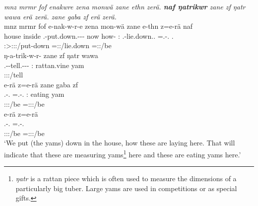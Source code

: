 \begin{exe}
	\ex \emph{mnz mrmr fof enakwre zena monwä zane ethn zerä. \textbf{naf ŋatrikwr} zane zf ŋatr wawa erä zerä. zane gaba zf erä zerä.}\\
	\glll mnz mrmr fof e-nak-w-r-e zena mon-wä zane e-thn z=e-rä naf\\
	house inside \Emph{} \Stnsg.\Alph-put.down.\Ext-\Ndu-\Lk-\Fnsg{} now how-\Emph{} \Dem:\Prox{} \Stnsg.\Alph-lie.down.\Ext.\Ndu{} \Prox=\Stnsg.\Alph-\Cop.\Ndu{} \Tsg.\Erg{}\\
	{} {} {} \footnotesize{\Fpl:\Sbj>\Stpl:\Obj:\Nonpast{}:\Ipfv/put-down} {} {} {} \footnotesize{\Prox=\Stpl:\Nonpast{}:\Ipfv/lie.down} \footnotesize{\Prox=\Stpl:\Nonpast{}:\Ipfv/be} {}\\
	\sn
	\glll ŋ-a-trik-w-r-\Zero{} zane zf ŋatr wawa\\
	\M.\Alph-\Vc-tell.\Ext-\Ndu-\Lk-\Stsg{} \Dem:\Prox{} \Imm{} rattan.vine yam\\
	\footnotesize{\Stsg:\Sbj:\Nonpast:\Ipfv/tell} {} {} {} {}\\
	\sn
	\glll e-rä z=e-rä zane gaba zf\\
	\Stnsg.\Alph-\Cop.\Ndu{} \Prox=\Stnsg.\Alph-\Cop.\Ndu{} \Dem:\Prox{} {eating yam} \Imm{}\\
	\footnotesize{\Stpl:\Sbj:\Nonpast{}:\Ipfv/be} \footnotesize{\Prox=\Stpl:\Sbj:\Nonpast{}:\Ipfv/be} {} {} {}\\
	\sn
	\glll e-rä z=e-rä\\
	\Stnsg.\Alph-\Cop.\Ndu{} \Prox=\Stnsg.\Alph-\Cop.\Ndu{}\\
	\footnotesize{\Stpl:\Sbj:\Nonpast{}:\Ipfv/be} \footnotesize{\Prox=\Stpl:\Sbj:\Nonpast{}:\Ipfv/be}\\
	\trans `We put (the yams) down in the house, how these are laying here. That will indicate that these are measuring yams\footnote{\emph{ŋatr} is a rattan piece which is often used to measure the dimensions of a particularly big tuber. Large yams are used in competitions or as special gifts.} here and these are eating yams here.'
	\label{ex167}
\end{exe}

